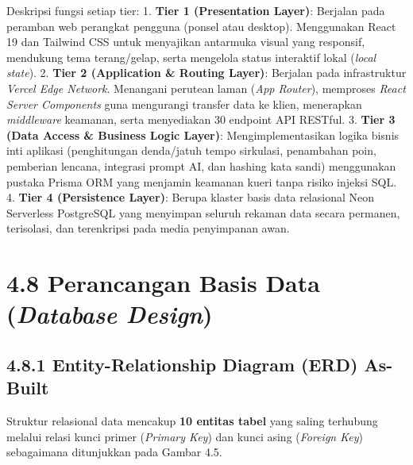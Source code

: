 \documentclass[
  indonesian,
  12pt,
]{report}
\begin{document}
Deskripsi fungsi setiap tier: 1. \textbf{Tier 1 (Presentation Layer)}:
Berjalan pada peramban web perangkat pengguna (ponsel atau desktop).
Menggunakan React 19 dan Tailwind CSS untuk menyajikan antarmuka visual
yang responsif, mendukung tema terang/gelap, serta mengelola status
interaktif lokal (\emph{local state}). 2. \textbf{Tier 2 (Application \&
Routing Layer)}: Berjalan pada infrastruktur \emph{Vercel Edge Network}.
Menangani perutean laman (\emph{App Router}), memproses \emph{React
Server Components} guna mengurangi transfer data ke klien, menerapkan
\emph{middleware} keamanan, serta menyediakan 30 endpoint API RESTful.
3. \textbf{Tier 3 (Data Access \& Business Logic Layer)}:
Mengimplementasikan logika bisnis inti aplikasi (penghitungan
denda/jatuh tempo sirkulasi, penambahan poin, pemberian lencana,
integrasi prompt AI, dan hashing kata sandi) menggunakan pustaka Prisma
ORM yang menjamin keamanan kueri tanpa risiko injeksi SQL. 4.
\textbf{Tier 4 (Persistence Layer)}: Berupa klaster basis data
relasional Neon Serverless PostgreSQL yang menyimpan seluruh rekaman
data secara permanen, terisolasi, dan terenkripsi pada media penyimpanan
awan.

\section{\texorpdfstring{4.8 Perancangan Basis Data (\emph{Database
Design})}{4.8 Perancangan Basis Data (Database Design)}}\label{perancangan-basis-data-database-design}

\subsection{4.8.1 Entity-Relationship Diagram (ERD)
As-Built}\label{entity-relationship-diagram-erd-as-built}

Struktur relasional data mencakup \textbf{10 entitas tabel} yang saling
terhubung melalui relasi kunci primer (\emph{Primary Key}) dan kunci
asing (\emph{Foreign Key}) sebagaimana ditunjukkan pada Gambar 4.5.
\end{document}
